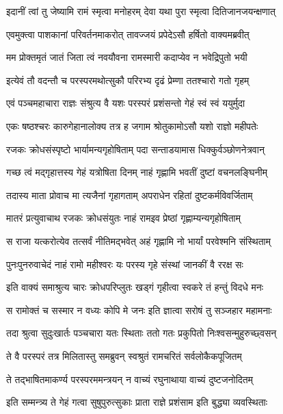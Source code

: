 \twolineshloka
{इदानीं त्वां तु जेष्यामि रामं स्मृत्वा मनोहरम्}
{देवा यथा पुरा स्मृत्वा दितिजानजयन्क्षणात्}%

\twolineshloka
{एवमुक्त्वा पाशकानां परिवर्तनमाकरोत्}
{तावज्जयं प्रपेदेऽसौ हर्षितो वाक्यमब्रवीत्}%

\twolineshloka
{मम प्रोक्तमृतं जातं जिता त्वं नवयौवना}
{रामस्मारी कदाप्येव न भवेद्रिपुतो भयी}%

\twolineshloka
{इत्येवं तौ वदन्तौ च परस्परमथोत्सुकौ}
{परिरभ्य दृढं प्रेम्णा ततश्चारो गतो गृहम्}%

\twolineshloka
{एवं पञ्चमहाचारा राज्ञः संश्रुत्य वै यशः}
{परस्परं प्रशंसन्तो गेहं स्वं स्वं ययुर्मुदा}%

\twolineshloka
{एकः षष्ठश्चरः कारुगेहानालोक्य तत्र ह}
{जगाम श्रोतुकामोऽसौ यशो राज्ञो महीपतेः}%

\twolineshloka
{रजकः क्रोधसंस्पृष्टो भार्यामन्यगृहोषिताम्}
{पदा सन्ताडयामास धिक्कुर्वञ्छोणनेत्रवान्}%

\twolineshloka
{गच्छ त्वं मद्गृहात्तस्य गेहं यत्रोषिता दिनम्}
{नाहं गृह्णामि भवतीं दुष्टां वचनलङ्घिनीम्}%

\twolineshloka
{तदास्य माता प्रोवाच मा त्यजैनां गृहागताम्}
{अपराधेन रहितां दुष्टकर्मविवर्जिताम्}%

\twolineshloka
{मातरं प्रत्युवाचाथ रजकः क्रोधसंयुतः}
{नाहं रामइव प्रेष्ठां गृह्णाम्यन्यगृहोषिताम्}%

\twolineshloka
{स राजा यत्करोत्येव तत्सर्वं नीतिमद्भवेत्}
{अहं गृह्णामि नो भार्यां परवेश्मनि संस्थिताम्}%

\twolineshloka
{पुनःपुनरुवाचेदं नाहं रामो महीश्वरः}
{यः परस्य गृहे संस्थां जानकीं वै ररक्ष सः}%

\twolineshloka
{इति वाक्यं समाश्रुत्य चारः क्रोधपरिप्लुतः}
{खड्गं गृहीत्वा स्वकरे तं हन्तुं विदधे मनः}%

\twolineshloka
{स रामोक्तं च सस्मार न वध्यः कोपि मे जनः}
{इति ज्ञात्वा सरोषं तु सञ्जहार महामनाः}%

\twolineshloka
{तदा श्रुत्वा सुदुःखार्तः पञ्चचारा यतः स्थिताः}
{ततो गतः प्रकुपितो निःश्वसन्मुहुरुच्छ्वसन्}%

\twolineshloka
{ते वै परस्परं तत्र मिलितास्तु समब्रुवन्}
{स्वश्रुतं रामचरितं सर्वलोकैकपूजितम्}%

\twolineshloka
{ते तद्भाषितमाकर्ण्य परस्परममन्त्रयन्}
{न वाच्यं रघुनाथाया वाच्यं दुष्टजनोदितम्}%

\twolineshloka
{इति सम्मन्त्र्य ते गेहं गत्वा सुषुपुरुत्सुकाः}
{प्राता राज्ञे प्रशंसाम इति बुद्ध्या व्यवस्थिताः}%

